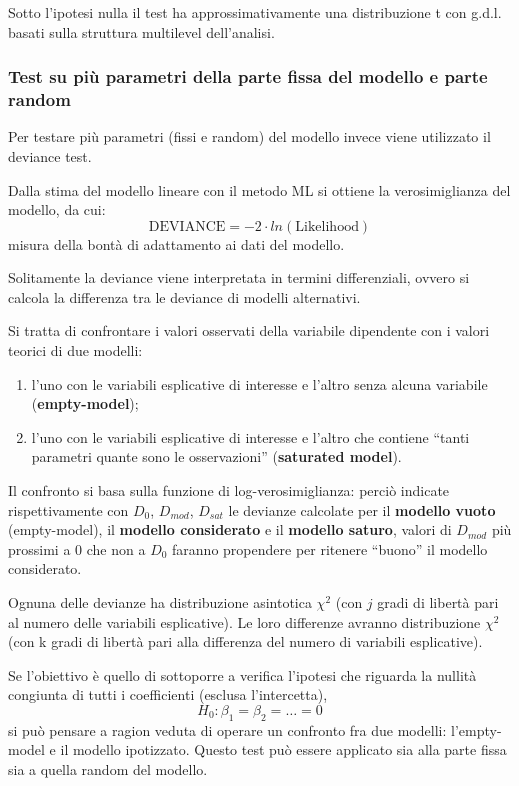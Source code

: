 \documentclass[a4page, 11pt]{article} %
\begin{document}
Sotto l’ipotesi nulla il test ha approssimativamente una distribuzione t con g.d.l. basati sulla struttura multilevel dell’analisi. 
\subsubsection*{Test su più parametri della parte fissa del modello e parte random}
Per testare più parametri (fissi e random) del modello invece viene utilizzato il deviance test. 

Dalla stima del modello lineare con il metodo ML si ottiene la verosimiglianza del modello, da cui: 
\begin{equation*}
\mathrm{DEVIANCE} = -2 \cdot ln(\mathrm{Likelihood}) 
\end{equation*}
misura della bontà di adattamento ai dati del modello.

Solitamente la deviance viene interpretata in termini differenziali, ovvero si calcola la differenza tra le deviance di modelli alternativi. 

Si tratta di confrontare i valori osservati della variabile dipendente con i valori teorici di due modelli: 
\begin{enumerate}[noitemsep]
\item l'uno con le variabili esplicative di interesse e l’altro senza alcuna variabile (\textbf{empty-model}); 
\item l'uno con le variabili esplicative di interesse e l’altro che contiene “tanti parametri quante sono le osservazioni” (\textbf{saturated model}).
\end{enumerate}
Il confronto si basa sulla funzione di log-verosimiglianza: perciò indicate rispettivamente con $D_0$, $D_{mod}$, $D_{sat}$ le devianze calcolate per il \textbf{modello vuoto} (empty-model), il \textbf{modello considerato} e il \textbf{modello saturo}, valori di $D_{mod}$ più prossimi a $0$ che non a $D_0$ faranno propendere per ritenere “buono” il modello considerato. 

Ognuna delle devianze ha distribuzione asintotica $\chi^2$ (con $j$ gradi di libertà pari al numero delle variabili esplicative). Le loro differenze avranno distribuzione $\chi^2$ (con k gradi di libertà pari alla differenza del numero di variabili esplicative).

Se l’obiettivo è quello di sottoporre a verifica l’ipotesi che riguarda la nullità congiunta di tutti i coefficienti (esclusa l’intercetta),
\begin{equation*}
H_0 : \beta_1 = \beta_2 = \dots = 0
\end{equation*}
si può pensare a ragion veduta di operare un confronto fra due modelli: l’empty-model e il modello ipotizzato. 
Questo test può essere applicato sia alla parte fissa sia a quella random del modello.
\newpage
\end{document}
